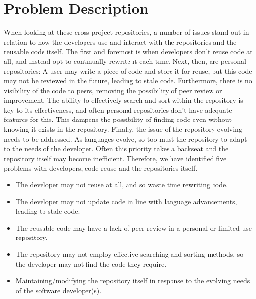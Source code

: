 \documentclass[11pt,openright,a4paper]{report}
\begin{document}
\section{Problem Description}
When looking at these cross-project repositories, a number of issues stand out in relation to how the developers use and interact with the repositories and the reusable code itself. The first and foremost is when developers don’t reuse code at all, and instead opt to continually rewrite it each time.
Next, then, are personal repositories: A user may write a piece of code and store it for reuse, but this code may not be reviewed in the future, leading to stale code. Furthermore, there is no visibility of the code to peers, removing the possibility of peer review or improvement.
The ability to effectively search and sort within the repository is key to its effectiveness, and often personal repositories don’t have adequate features for this. This dampens the possibility of finding code even without knowing it exists in the repository.
Finally, the issue of the repository evolving needs to be addressed. As languages evolve, so too must the repository to adapt to the needs of the developer. Often this priority takes a backseat and the repository itself may become inefficient. Therefore, we have identified five problems with developers, code reuse and the repositories itself.

\begin{itemize}
\item The developer may not reuse at all, and so waste time rewriting code.
\item The developer may not update code in line with language advancements, leading to stale code. 
\item The reusable code may have a lack of peer review in a personal or limited use repository.
\item The repository may not employ effective searching and sorting methods, so the developer may not find the code they require.
\item Maintaining/modifying the repository itself in response to the evolving needs of the software developer(s). 
\end{itemize}





\end{document}
